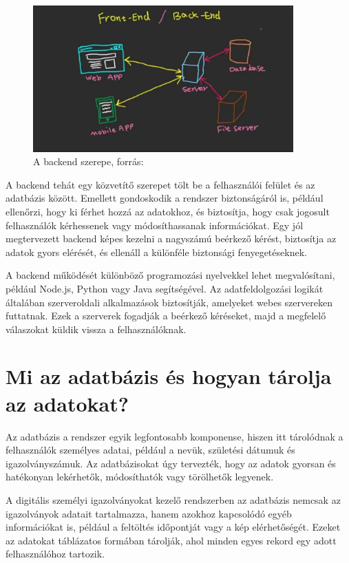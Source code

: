 \documentclass[
]{thesis-ekf}
\theoremstyle{definition}
\theoremstyle{remark}
\begin{document}
	\begin{figure}[ht!]
		\centering
		\includegraphics[width=10cm]{backend_database_relationship}
		\caption{A backend szerepe, forrás: \cite{backend}}
		\label{fig-backend}
	\end{figure}
	
	A backend tehát egy közvetítő szerepet tölt be a felhasználói felület és az adatbázis között. Emellett gondoskodik a rendszer biztonságáról is, például ellenőrzi, hogy ki férhet hozzá az adatokhoz, és biztosítja, hogy csak jogosult felhasználók kérhessenek vagy módosíthassanak információkat. Egy jól megtervezett backend képes kezelni a nagyszámú beérkező kérést, biztosítja az adatok gyors elérését, és ellenáll a különféle biztonsági fenyegetéseknek.
	
	A backend működését különböző programozási nyelvekkel lehet megvalósítani, például Node.js, Python vagy Java segítségével. Az adatfeldolgozási logikát általában szerveroldali alkalmazások biztosítják, amelyeket webes szervereken futtatnak. Ezek a szerverek fogadják a beérkező kéréseket, majd a megfelelő válaszokat küldik vissza a felhasználóknak.
	
	\section{Mi az adatbázis és hogyan tárolja az adatokat?}
	Az adatbázis a rendszer egyik legfontosabb komponense, hiszen itt tárolódnak a felhasználók személyes adatai, például a nevük, születési dátumuk és igazolványszámuk. Az adatbázisokat úgy tervezték, hogy az adatok gyorsan és hatékonyan lekérhetők, módosíthatók vagy törölhetők legyenek.
	
	A digitális személyi igazolványokat kezelő rendszerben az adatbázis nemcsak az igazolványok adatait tartalmazza, hanem azokhoz kapcsolódó egyéb információkat is, például a feltöltés időpontját vagy a kép elérhetőségét. Ezeket az adatokat táblázatos formában tárolják, ahol minden egyes rekord egy adott felhasználóhoz tartozik.
	
\end{document}
